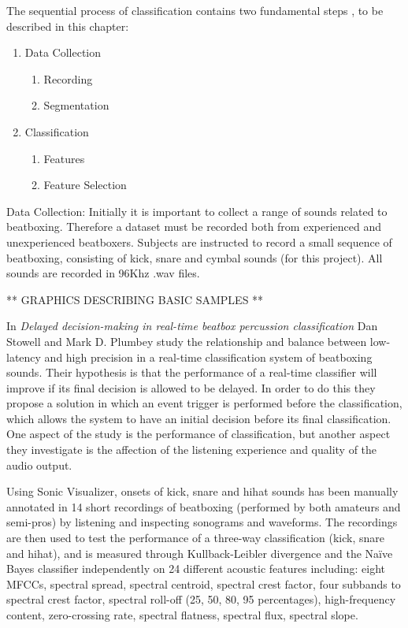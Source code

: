 The sequential process of classification contains two fundamental steps \cite{Sinyor05}, to be described in this chapter: 
\begin{enumerate}
	\item Data Collection
		\begin{enumerate}
			\item Recording
			\item Segmentation
		\end{enumerate}
	\item Classification
		\begin{enumerate}
			\item Features
			\item Feature Selection
		\end{enumerate}
\end{enumerate}

Data Collection: 
Initially it is important to collect a range of sounds related to beatboxing. Therefore a dataset must be recorded both from experienced and unexperienced beatboxers. Subjects are instructed to record a small sequence of beatboxing, consisting of kick, snare and cymbal sounds (for this project). All sounds are recorded in 96Khz .wav files. 

** GRAPHICS DESCRIBING BASIC SAMPLES ** 

In \textit{Delayed decision-making in real-time beatbox percussion classification} Dan Stowell and Mark D. Plumbey study the relationship and balance between low-latency and high precision in a real-time classification system of beatboxing sounds. Their hypothesis is that the performance of a real-time classifier will improve if its final decision is allowed to be delayed. 
In order to do this they propose a solution in which an event trigger is performed before the classification, which allows the system to have an initial decision before its final classification. One aspect of the study is the performance of classification, but another aspect they investigate is the affection of the listening experience and quality of the audio output. 

Using Sonic Visualizer, onsets of kick, snare and hihat sounds has been manually annotated in 14 short recordings of beatboxing (performed by both amateurs and semi-pros) by listening and inspecting sonograms and waveforms. The recordings are then used to test the performance of a three-way classification (kick, snare and hihat), and is measured through Kullback-Leibler divergence and the Naïve Bayes classifier independently on 24 different acoustic features including: eight MFCCs, spectral spread, spectral centroid, spectral crest factor, four subbands to spectral crest factor, spectral roll-off (25, 50, 80, 95 percentages), high-frequency content, zero-crossing rate, spectral flatness, spectral flux, spectral slope.

